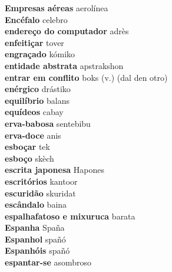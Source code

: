 \textbf{ Empresas aéreas  } aerolínea \\
\textbf{ Encéfalo  } celebro \\
\textbf{ endereço do computador  } adrès \\
\textbf{ enfeitiçar  } tover \\
\textbf{ engraçado  } kómiko \\
\textbf{ entidade abstrata  } apstrakshon \\
\textbf{ entrar em conflito  } boks (v.) (dal den otro) \\
\textbf{ enérgico  } drástiko \\
\textbf{ equilíbrio  } balans \\
\textbf{ equídeos  } cabay \\
\textbf{ erva-babosa  } sentebibu \\
\textbf{ erva-doce  } anis \\
\textbf{ esboçar  } tek \\
\textbf{ esboço  } skèch \\
\textbf{ escrita japonesa  } Hapones \\
\textbf{ escritórios  } kantoor \\
\textbf{ escuridão  } skuridat \\
\textbf{ escândalo  } baina \\
\textbf{ espalhafatoso e mixuruca  } barata \\
\textbf{ Espanha  } Spaña \\
\textbf{ Espanhol  } spañó \\
\textbf{ Espanhóis  } spañó \\
\textbf{ espantar-se  } asombroso \\
